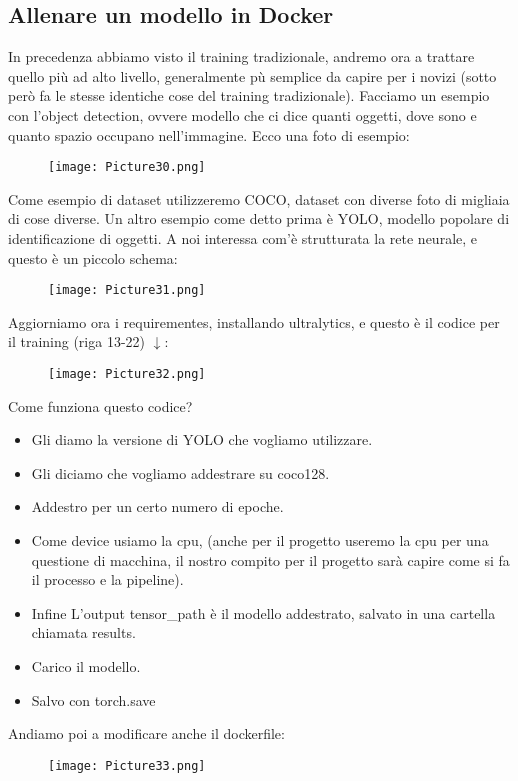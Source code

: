 \documentclass[a4paper,12pt]{article}
\begin{document}
\subsection{Allenare un modello in Docker}
In precedenza abbiamo visto il training tradizionale, andremo ora a trattare quello più ad alto livello, generalmente pù semplice da capire per i novizi (sotto però fa le stesse identiche cose del training tradizionale). 
Facciamo un esempio con l'object detection, ovvere modello che ci dice quanti oggetti, dove sono e quanto spazio occupano nell'immagine. Ecco una foto di esempio:
\begin{figure}[H]
    \centering
    \texttt{[image: Picture30.png]}
\end{figure}
\noindent Come esempio di dataset utilizzeremo COCO, dataset con diverse foto di migliaia di cose diverse. Un altro esempio come detto prima è YOLO, modello popolare di identificazione di oggetti. 
A noi interessa com'è strutturata la rete neurale, e questo è un piccolo schema:
\begin{figure}[H]
    \centering
    \texttt{[image: Picture31.png]}
\end{figure}
\noindent Aggiorniamo ora i requirementes, installando ultralytics, e questo è il codice per il training (riga 13-22) $\downarrow$:
\begin{figure}[H]
    \centering
    \texttt{[image: Picture32.png]}
\end{figure}
Come funziona questo codice?
\begin{itemize}
    \item Gli diamo la versione di YOLO che vogliamo utilizzare.
    \item Gli diciamo che vogliamo addestrare su coco128.
    \item Addestro per un certo numero di epoche.
    \item Come device usiamo la cpu, (anche per il progetto useremo la cpu per una questione di macchina, il nostro compito per il progetto sarà capire come si fa il processo e la pipeline).
    \item Infine L'output tensor\_path è il modello addestrato, salvato in una cartella chiamata results.
    \item Carico il modello.
    \item Salvo con torch.save
\end{itemize}
Andiamo poi a modificare anche il dockerfile:
\begin{figure}[H]
    \centering
    \texttt{[image: Picture33.png]}
\end{figure}
\end{document}
